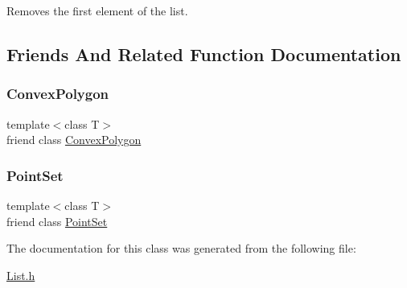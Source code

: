 Removes the first element of the list. 



\subsection{Friends And Related Function Documentation}
\mbox{\label{class_list_a3efb5f47c0842087c3076652f3d62832}} 
\subsubsection{\texorpdfstring{Convex\+Polygon}{ConvexPolygon}}
{\footnotesize\ttfamily template$<$class T$>$ \\
friend class \hyperlink{class_convex_polygon}{Convex\+Polygon}\hspace{0.3cm}{\ttfamily [friend]}}

\mbox{\label{class_list_a7719ee4382f1049bf06f7136702ca280}} 
\subsubsection{\texorpdfstring{Point\+Set}{PointSet}}
{\footnotesize\ttfamily template$<$class T$>$ \\
friend class \hyperlink{class_point_set}{Point\+Set}\hspace{0.3cm}{\ttfamily [friend]}}



The documentation for this class was generated from the following file\+:\begin{DoxyCompactItemize}
\item 
\hyperlink{_list_8h}{List.\+h}\end{DoxyCompactItemize}

